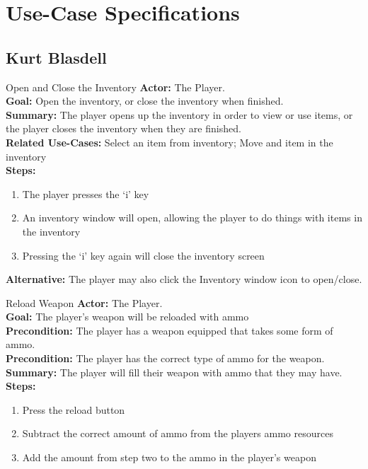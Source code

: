 \documentclass[12pt]{report}
\begin{document}
\chapter{Use-Case Specifications}


\section{Kurt Blasdell}
\begin{subsection}{Open and Close the Inventory}
\textbf{Actor:} The Player. \\
\textbf{Goal:} Open the inventory, or close the inventory when finished. \\
\textbf{Summary:} The player opens up the inventory in order to view or use items, or the player closes the inventory when they are finished. \\
\textbf{Related Use-Cases:} Select an item from inventory; Move and item in the inventory \\
\textbf{Steps:}
\begin{enumerate}
	\item The player presses the ‘i’ key
	\item An inventory window will open, allowing the player to do things with items in the inventory
	\item Pressing the ‘i’ key again will close the inventory screen
\end{enumerate}
\textbf{Alternative:} The player may also click the Inventory window icon to open/close.
\end{subsection}

\begin{subsection}{Reload Weapon}
\textbf{Actor:} The Player. \\
\textbf{Goal:} The player’s weapon will be reloaded with ammo \\
\textbf{Precondition:} The player has a weapon equipped that takes some form of ammo. \\
\textbf{Precondition:} The player has the correct type of ammo for the weapon. \\
\textbf{Summary:} The player will fill their weapon with ammo that they may have. \\
\textbf{Steps:}
\begin{enumerate}
	\item Press the reload button
	\item Subtract the correct amount of ammo from the players ammo resources
	\item Add the amount from step two to the ammo in the player’s weapon
\end{enumerate}
\end{subsection}
\end{document}
